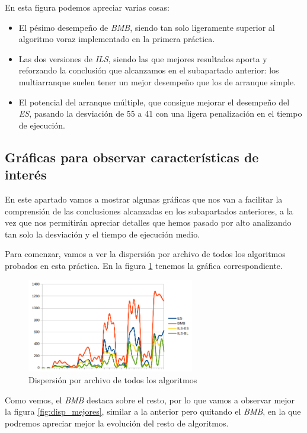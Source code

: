 En esta figura podemos apreciar varias cosas:

\begin{itemize}
    \item El pésimo desempeño de \textit{BMB}, siendo tan solo ligeramente superior al algoritmo voraz implementado en la primera práctica.
    \item Las dos versiones de \textit{ILS}, siendo las que mejores resultados aporta y reforzando la conclusión que alcanzamos en el subapartado anterior: los multiarranque suelen tener un mejor desempeño que los de arranque simple.
    \item El potencial del arranque múltiple, que consigue mejorar el desempeño del \textit{ES}, pasando la desviación de 55 a 41 con una ligera penalización en el tiempo de ejecución.
\end{itemize}


\subsection{Gráficas para observar características de interés}

En este apartado vamos a mostrar algunas gráficas que nos van a facilitar la comprensión de las conclusiones alcanzadas en los subapartados anteriores, a la vez que nos permitirán apreciar detalles que hemos pasado por alto analizando tan solo la desviación y el tiempo de ejecución medio.

Para comenzar, vamos a ver la dispersión por archivo de todos los algoritmos probados en esta práctica. En la figura \ref{fig:dispTodos} tenemos la gráfica correspondiente.

\begin{figure}[H]
    \centering
    \includegraphics[width=0.65\textwidth]{"data/disp_todos.png"}
    \caption{Dispersión por archivo de todos los algoritmos}
    \label{fig:dispTodos}
\end{figure}

Como vemos, el \textit{BMB} destaca sobre el resto, por lo que vamos a observar mejor la figura \ref{fig:disp_mejores}, similar a la anterior pero quitando el \textit{BMB}, en la que podremos apreciar mejor la evolución del resto de algoritmos.

